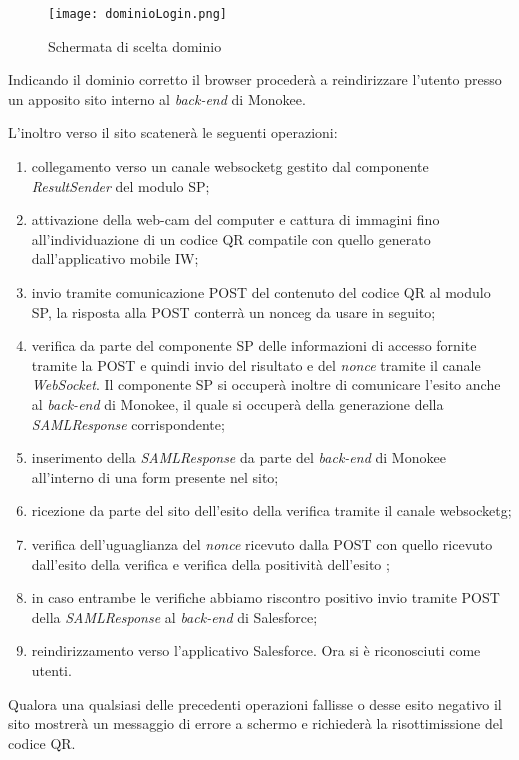 \begin{figure}[!h]
    
    \centering
    \texttt{[image: dominioLogin.png]} 
    \caption{Schermata di scelta dominio}
    \label{fig:salesforce-dom} 
\end{figure}

Indicando il dominio corretto il browser procederà a reindirizzare l'utento presso un apposito sito interno al \emph{back-end} di Monokee.

L'inoltro verso il sito scatenerà le seguenti operazioni:
\begin{enumerate}
    \item collegamento verso un canale \gls{websocketg} gestito dal componente \emph{ResultSender} del modulo SP;
    \item attivazione della web-cam del computer e cattura di immagini fino all'individuazione di un codice QR compatile con quello generato dall'applicativo mobile IW;
    \item invio tramite comunicazione POST del contenuto del codice QR al modulo SP, la risposta alla POST conterrà un \gls{nonceg} da usare in seguito;
    \item verifica da parte del componente SP delle informazioni di accesso fornite tramite la POST e quindi invio del risultato e del \emph{nonce} tramite il canale \emph{WebSocket}. Il componente SP si occuperà inoltre di comunicare l'esito anche al \emph{back-end} di Monokee, il quale si occuperà della generazione della \emph{SAMLResponse} corrispondente;
    \item inserimento della \emph{SAMLResponse} da parte del \emph{back-end} di Monokee all'interno di una form presente nel sito;
    \item ricezione da parte del sito dell'esito della verifica tramite il canale \gls{websocketg};
    \item verifica dell'uguaglianza del \emph{nonce} ricevuto dalla POST con quello ricevuto dall'esito della verifica e verifica della positività dell'esito ;
    \item in caso entrambe le verifiche abbiamo riscontro positivo invio tramite POST della \emph{SAMLResponse} al \emph{back-end} di Salesforce;
    \item reindirizzamento verso l'applicativo Salesforce. Ora si è riconosciuti come utenti.
\end{enumerate}

\noindent Qualora una qualsiasi delle precedenti operazioni fallisse o desse esito negativo il sito mostrerà un messaggio di errore a schermo e richiederà la risottimissione del codice QR.
